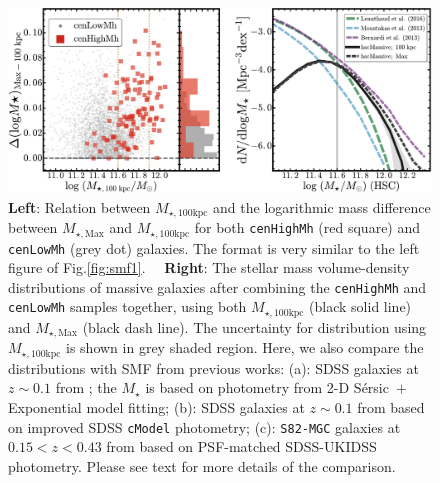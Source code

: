 \documentclass{emulateapj}
\def\ser{{S\'{e}rsic\ }}
\def\rbcg{\texttt{cenHighMh}}
\def\nbcg{\texttt{cenLowMh}}
\def\mstar{{$M_{\star}$}}
\def\mtot{{$M_{\star,100\mathrm{kpc}}$}}
\def\mmax{{$M_{\star,\mathrm{Max}}$}}
\newcommand{\update}[1]{\textcolor{Bittersweet}{#1}}
\begin{document}
\begin{CJK*}{UTF8}{gbsn}
  \begin{figure}[t]
      \centering 
      \includegraphics[width=\textwidth]{fig/redbcg_discussion_5}
      \caption{
      \update{
          \textbf{Left}: Relation between \mtot{} and the logarithmic mass difference 
          between \mmax{} and \mtot{} for both \rbcg{} (red square) and \nbcg{} 
          (grey dot) galaxies.  The format is very similar to the left figure of 
          Fig.\ref{fig:smf1}.~~
          \textbf{Right}: The stellar mass volume-density distributions of massive galaxies 
          after combining the \rbcg{} and \nbcg{} samples together, using both 
          \mtot{} (black solid line) and \mmax{} (black dash line). 
          The uncertainty for distribution using \mtot{} is shown in grey shaded region.  
          Here, we also compare the distributions with SMF from previous works: 
          (a): SDSS galaxies at $z\sim 0.1$ from \citet{Bernardi2013}; the \mstar{} is 
          based on photometry from 2-D \ser{}$+$Exponential model fitting; 
          (b): SDSS galaxies at $z\sim 0.1$ from \citet{Moustakas13} based on 
          improved SDSS \texttt{cModel} photometry; 
          (c): \texttt{S82-MGC} galaxies at $0.15 < z< 0.43$ from 
          \citet{Leauthaud2016} based on PSF-matched SDSS-UKIDSS photometry.
          Please see text for more details of the comparison.
          }}
      \label{fig:discussion_2}
  \end{figure}
    


\end{CJK*}
\end{document}
